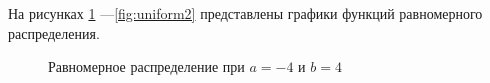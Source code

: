 На рисунках \ref{fig:uniform1} ---\ref{fig:uniform2} представлены графики функций равномерного распределения.

\begin{figure}[h!]
	\caption{Равномерное распределение при $a = -4$ и $b = 4$}
	\label{fig:uniform1}
\end{figure}

